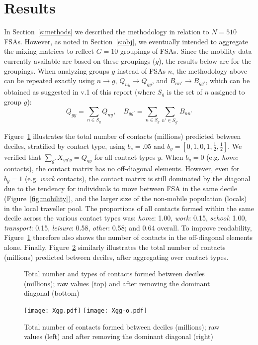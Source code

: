 \documentclass{article}
\begin{document}
  \section{Results}\label{s:results}
  In Section~\ref{s:methods} we described the methodology in relation to $N=510$ FSAs.
  However, as noted in Section~\ref{s:obj}, we eventually intended to aggregate the mixing matrices
  to reflect $G=10$ groupings of FSAs.
  Since the mobility data currently available are based on these groupings ($g$),
  the results below are for the groupings.
  When analyzing groups $g$ instead of FSAs $n$,
  the methodology above can be repeated exactly using $n \rightarrow g$,
  $Q_{ny} \rightarrow Q_{gy}$, and $B_{nn'} \rightarrow B_{gg'}$,
  which can be obtained as suggested in v.1 of this report
  (where $S_g$ is the set of $n$ assigned to group $g$):
  \begin{equation}
    Q_{gy} = \sum_{n \in S_g} Q_{ny},\quad
    B_{gg'} = \sum_{n \in S_g} \sum_{n' \in S_{g'}} B_{nn'}
  \end{equation}
  \par
  Figure~\ref{fig:Xggy} illustrates the total number of contacts (millions)
  predicted between deciles, stratified by contact type,
  using $b_s = .05$ and $b_y = [0,1,0,1,\frac{1}{2},\frac{1}{2}]$.
  We verified that $\sum_{g'} {X_{gg'y}} = Q_{gy}$ for all contact types $y$.
  When $b_y = 0$ (e.g. \emph{home} contacts), the contact matrix has no off-diagonal elements.
  However, even for $b_y = 1$ (e.g. \emph{work} contacts),
  the contact matrix is still dominated by the diagonal
  due to the tendency for individuals to move between FSA in the same decile
  (Figure~\ref{fig:mobility}),
  and the larger size of the non-mobile population (locals) in the local traveller pool.
  The proportions of all contacts formed within the same decile across the various contact types was:
  \emph{home}: 1.00, \emph{work}: 0.15, \emph{school}: 1.00, \emph{transport}: 0.15, \emph{leisure}: 0.58, \emph{other}: 0.58;
  and 0.64 overall.
  To improve readability, Figure~\ref{fig:Xggy} therefore also shows the number of contacts
  in the off-diagonal elements alone.
  Finally, Figure~\ref{fig:Xgg} similarly illustrates the total number of contacts (millions)
  predicted between deciles, after aggregating over contact types.
  \begin{figure}
    \centering
    \caption{Total number and types of contacts formed between deciles (millions);
      raw values (top) and after removing the dominant diagonal (bottom)}
    \label{fig:Xggy}
  \end{figure}
  \begin{figure}
    \centering
    \texttt{[image: Xgg.pdf]}%
    \texttt{[image: Xgg-o.pdf]}
    \caption{Total number of contacts formed between deciles (millions);
      raw values (left) and after removing the dominant diagonal (right)}
    \label{fig:Xgg}
  \end{figure}
  \appendix
\end{document}
